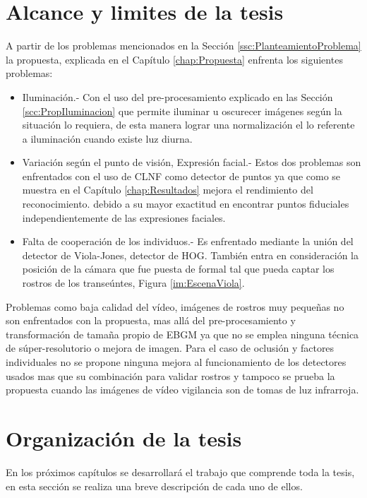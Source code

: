 \section{Alcance y limites de la tesis}
A partir de los problemas mencionados en la Sección \ref{ssc:PlanteamientoProblema} la propuesta, explicada en el Capítulo \ref{chap:Propuesta} enfrenta los siguientes problemas:
\begin{itemize}
 \item Iluminación.- Con el uso del pre-procesamiento explicado en las Sección \ref{scc:PropIluminacion} que permite iluminar u oscurecer imágenes según  la situación lo requiera, de esta manera lograr una normalización el lo referente a iluminación cuando existe luz diurna.
 \item Variación según el punto de visión, Expresión facial.- Estos dos problemas son enfrentados con el uso de \ac{CLNF} como detector de puntos ya que como se muestra en el Capítulo \ref{chap:Resultados} mejora el rendimiento del reconocimiento. debido a su mayor exactitud en encontrar puntos fiduciales independientemente de las expresiones faciales.
\item Falta de cooperación de los individuos.- Es enfrentado mediante la unión del detector de Viola-Jones, detector de \ac{HOG}. También entra en consideración la posición de la cámara que fue puesta de formal tal que pueda captar los rostros de los transeúntes, Figura \ref{im:EscenaViola}.
\end{itemize}

Problemas como baja calidad del vídeo, imágenes de rostros muy pequeñas no son enfrentados con la propuesta, mas allá del pre-procesamiento y transformación de tamaña propio de \ac{EBGM} ya que no se emplea ninguna técnica de súper-resolutorio o mejora de imagen. Para el caso de oclusión y factores individuales no se propone ninguna mejora al funcionamiento de los detectores usados mas que su combinación para validar rostros y tampoco se prueba la propuesta cuando las imágenes de vídeo vigilancia  son de tomas de luz infrarroja.

\section{Organización de la tesis}
En los próximos capítulos se desarrollará el trabajo que comprende toda la tesis, en esta sección se realiza una breve descripción de cada uno de ellos.


